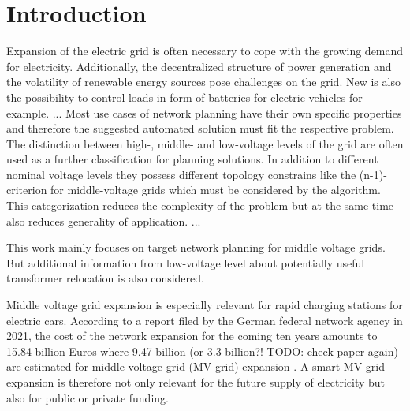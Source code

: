 \chapter{Introduction}\label{chap:introduction}



Expansion of the electric grid is often necessary to cope with the growing demand for electricity. Additionally, the decentralized structure of power generation and the volatility of renewable energy sources pose challenges on the grid. New is also the possibility to control loads in form of batteries for electric vehicles for example.
...
Most use cases of network planning have their own specific properties and therefore the suggested automated solution must fit the respective problem. The distinction between high-, middle- and low-voltage levels of the grid are often used as a further classification for planning solutions. In addition to different nominal voltage levels they possess different topology constrains like the (n-1)-criterion for middle-voltage grids which must be considered by the algorithm. This categorization reduces the complexity of the problem but at the same time also reduces generality of application. ...

This work mainly focuses on target network planning for middle voltage grids. But additional information from low-voltage level about potentially useful transformer relocation is also considered.

Middle voltage grid expansion is especially relevant for rapid charging stations for electric cars. According to a report filed by the German federal network agency in 2021, the cost of the network expansion for the coming ten years amounts to 15.84 billion Euros where 9.47 billion (or 3.3 billion?! TODO: check paper again) are estimated for middle voltage grid (MV grid) expansion \cite{Ausbaubericht_2021_page14}. A smart MV grid expansion is therefore not only relevant for the future supply of electricity but also for public or private funding. \\

